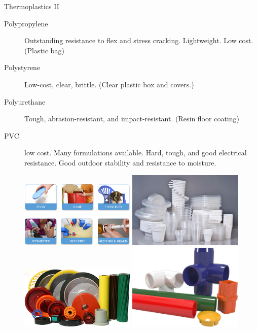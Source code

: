 \documentclass[10pt, svgnames]{beamer}
\begin{document}
\begin{frame}[label={sec:orgd7e54a9}]{Thermoplastics II}
\begin{description}
\item[{Polypropylene}] Outstanding resistance to flex and stress cracking. Lightweight. Low cost. (Plastic bag)
\item[{Polystyrene}] Low-cost, clear, brittle. (Clear plastic box and covers.)
\item[{Polyurethane}] Tough, abrasion-resistant, and impact-resistant. (Resin floor coating)
\item[{PVC}] low cost. Many formulations available. Hard, tough, and good electrical resistance. Good outdoor stability and resistance to moisture.

\centering
\includegraphics[width=0.45\textwidth]{pictures/polypropylene}
\includegraphics[width=0.45\textwidth]{pictures/polystyrene} \\\empty
\includegraphics[width=0.45\textwidth]{pictures/polyurethane}
\includegraphics[width=0.45\textwidth]{pictures/pvc}
\end{description}
\end{frame}
\end{document}
